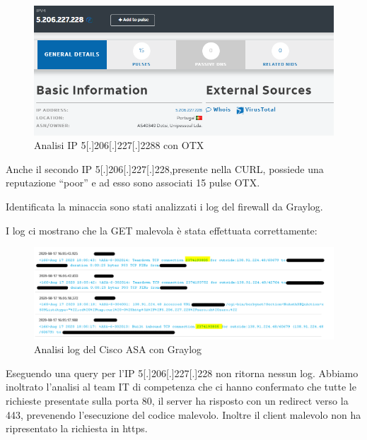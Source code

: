  \newpage
 
 \begin{figure}[h]
    \begin{center}
        \includegraphics[width=0.98\columnwidth]{images/4_caso_d'uso_img/otxIp2.PNG}
    \end{center}
    \caption{Analisi IP 5[.]206[.]227[.]2288 con OTX}
    \label{fig:Analisi IP2 con OTX}
\end{figure} 

Anche il secondo IP 5[.]206[.]227[.]228,presente nella CURL, possiede una reputazione “poor” e ad esso sono associati 15 pulse OTX.

Identificata la minaccia sono stati analizzati i log del firewall da Graylog.\par
I log ci mostrano che la GET malevola è stata effettuata correttamente:

 \begin{figure}[h]
    \begin{center}
        \includegraphics[width=0.98\columnwidth]{images/4_caso_d'uso_img/graylogZero.png}
    \end{center}
    \caption{Analisi log del Cisco ASA con Graylog}
    \label{fig:Analisi log del Cisco ASA con Graylog}
\end{figure} 

Eseguendo una query per l’IP 5[.]206[.]227[.]228 non ritorna nessun log.
Abbiamo inoltrato l’analisi al team IT di competenza che ci hanno confermato che tutte le richieste presentate sulla porta 80, il server ha risposto con un redirect verso la 443, prevenendo l’esecuzione del codice malevolo. Inoltre il client malevolo non ha ripresentato la richiesta in https.\par

